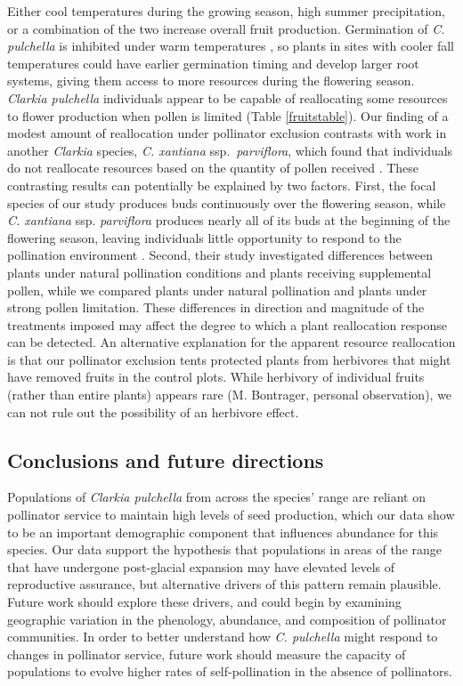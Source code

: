 \documentclass{article}
\begin{document}
Either cool temperatures during the growing season, high summer precipitation, or a combination of the two increase overall fruit production. Germination of \textit{C. pulchella} is inhibited under warm temperatures \citep{lewis1955genus}, so plants in sites with cooler fall temperatures could have earlier germination timing and develop larger root systems, giving them access to more resources during the flowering season. \textit{Clarkia pulchella} individuals appear to be capable of reallocating some resources to flower production when pollen is limited (Table \ref{fruitstable}). Our finding of a modest amount of reallocation under pollinator exclusion contrasts with work in another \textit{Clarkia} species, \textit{C. xantiana} ssp.\ \textit{parviflora}, which found that individuals do not reallocate resources based on the quantity of pollen received \citep{runquist2013resource}. These contrasting results can potentially be explained by two factors. First, the focal species of our study produces buds continuously over the flowering season, while \textit{C. xantiana} ssp. \textit{parviflora} produces nearly all of its buds at the beginning of the flowering season, leaving individuals little opportunity to respond to the pollination environment \citep{runquist2013resource}. Second, their study investigated differences between plants under natural pollination conditions and plants receiving supplemental pollen, while we compared plants under natural pollination and plants under strong pollen limitation. These differences in direction and magnitude of the treatments imposed may affect the degree to which a plant reallocation response can be detected. An alternative explanation for the apparent resource reallocation is that our pollinator exclusion tents protected plants from herbivores that might have removed fruits in the control plots. While herbivory of individual fruits (rather than entire plants) appears rare (M. Bontrager, personal observation), we can not rule out the possibility of an herbivore effect.

\subsection*{Conclusions and future directions}
Populations of \textit{Clarkia pulchella} from across the species' range are reliant on pollinator service to maintain high levels of seed production, which our data show to be an important demographic component that influences abundance for this species. Our data support the hypothesis that populations in areas of the range that have undergone post-glacial expansion may have elevated levels of reproductive assurance, but alternative drivers of this pattern remain plausible. Future work should explore these drivers, and could begin by examining geographic variation in the phenology, abundance, and composition of pollinator communities. In order to better understand how \textit{C. pulchella} might respond to changes in pollinator service, future work should measure the capacity of populations to evolve higher rates of self-pollination in the absence of pollinators. 
\end{document}
